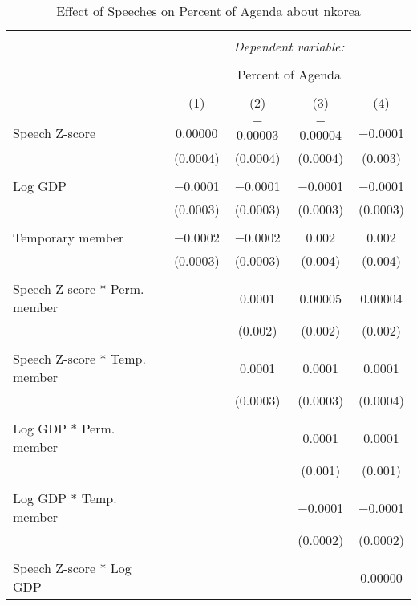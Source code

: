 
\begin{table}[!htbp] \centering 
  \caption{Effect of Speeches on Percent of Agenda about nkorea} 
  \label{} 
\begin{tabular}{@{\extracolsep{5pt}}lcccc} 
\\[-1.8ex]\hline 
\hline \\[-1.8ex] 
 & \multicolumn{4}{c}{\textit{Dependent variable:}} \\ 
\cline{2-5} 
\\[-1.8ex] & \multicolumn{4}{c}{Percent of Agenda} \\ 
\\[-1.8ex] & (1) & (2) & (3) & (4)\\ 
\hline \\[-1.8ex] 
 Speech Z-score & 0.00000 & $-$0.00003 & $-$0.00004 & $-$0.0001 \\ 
  & (0.0004) & (0.0004) & (0.0004) & (0.003) \\ 
  & & & & \\ 
 Log GDP & $-$0.0001 & $-$0.0001 & $-$0.0001 & $-$0.0001 \\ 
  & (0.0003) & (0.0003) & (0.0003) & (0.0003) \\ 
  & & & & \\ 
 Temporary member & $-$0.0002 & $-$0.0002 & 0.002 & 0.002 \\ 
  & (0.0003) & (0.0003) & (0.004) & (0.004) \\ 
  & & & & \\ 
 Speech Z-score * Perm. member &  & 0.0001 & 0.00005 & 0.00004 \\ 
  &  & (0.002) & (0.002) & (0.002) \\ 
  & & & & \\ 
 Speech Z-score * Temp. member &  & 0.0001 & 0.0001 & 0.0001 \\ 
  &  & (0.0003) & (0.0003) & (0.0004) \\ 
  & & & & \\ 
 Log GDP * Perm. member &  &  & 0.0001 & 0.0001 \\ 
  &  &  & (0.001) & (0.001) \\ 
  & & & & \\ 
 Log GDP * Temp. member &  &  & $-$0.0001 & $-$0.0001 \\ 
  &  &  & (0.0002) & (0.0002) \\ 
  & & & & \\ 
 Speech Z-score * Log GDP &  &  &  & 0.00000 \\ 

\end{tabular}
\end{table}
